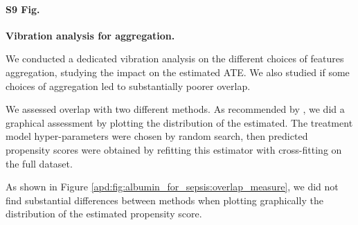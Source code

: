 \documentclass[10pt,letterpaper]{article}
\begin{document}
\paragraph*{S9 Fig.}
\label{apd:vibration_analysis_for_aggregation}
{\bf Vibration analysis for aggregation.}

We conducted a dedicated vibration analysis on the different choices of
features aggregation, studying the impact on the estimated ATE. We also
studied if some choices of aggregation led to substantially poorer overlap.

We assessed overlap with two different methods. As recommended by
\cite{austin2015moving}, we did a graphical assessment by plotting the
distribution of the estimated. The treatment model hyper-parameters were chosen
by random search, then predicted propensity scores were obtained by refitting
this estimator with cross-fitting on the full dataset.

As shown in Figure \ref{apd:fig:albumin_for_sepsis:overlap_measure}, we did not find substantial differences between methods
when plotting graphically the distribution of the estimated propensity score.
\end{document}
